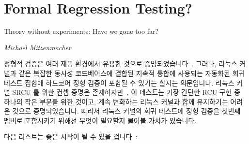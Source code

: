 
\section{Formal Regression Testing?}
\label{sec:future:Formal Regression Testing?}
%
\epigraph{Theory without experiments: Have we gone too far?}
	 {\emph{Michael Mitzenmacher}}

정형적 검증은 여러 제품 환경에서 유용한 것으로
증명되었습니다~\cite{JamesRLarus2004RightingSoftware,AlBessey2010BillionLoCLater,ByronCook2018FormalAmazon,CaitlinSadowski2018staticAnalysisGoogle,DinoDistefano2019FBstaticAnalysis}.
그러나, 리눅스 커널과 같은 복잡한 동시성 코드베이스에 결합된 지속적 통합에
사용되는 자동화된 회귀 테스트 집합에 하드코어 정형 검증이 포함될 수 있기는
할지는 의문입니다.
리눅스 커널 SRCU 를 위한 컨셉 증명은 존재하지만~\cite{LanceRoy2017CBMC-SRCU},
이 테스트는 가장 간단한 RCU 구현 중 하나의 작은 부분을 위한 것이고, 계속
변화하는 리눅스 커널과 함께 유지하기는 어려운 것으로 증명되었습니다.
따라서 리눅스 커널의 회귀 테스트에 정형 검증을 첫번째 멤버로 포함시키기 위해선
무엇이 필요할지 물어볼 가치가 있습니다.

다음 리스트는 좋은 시작이 될 수 있을
겁니다~\cite[slide 34]{PaulEMcKenney2015DagstuhlVerification}:

\iffalse

Formal verification has long proven useful in a number of production
environments~\cite{JamesRLarus2004RightingSoftware,AlBessey2010BillionLoCLater,ByronCook2018FormalAmazon,CaitlinSadowski2018staticAnalysisGoogle,DinoDistefano2019FBstaticAnalysis}.
However, it is an question as to whether hard-core formal verification
will ever be included in the automated regression-test suites used for
continuous integration within complex concurrent codebases, such as the
Linux kernel.
Although there is already a proof of concept for Linux-kernel
SRCU~\cite{LanceRoy2017CBMC-SRCU}, this test is for a small portion
of one of the simplest RCU implementations, and has proven difficult
to keep it current with the ever-changing Linux kernel.
It is therefore worth asking what would be required to incorporate
formal verification as first-class members of the Linux kernel's
regression tests.

The following list is a good
start~\cite[slide 34]{PaulEMcKenney2015DagstuhlVerification}:

\fi

